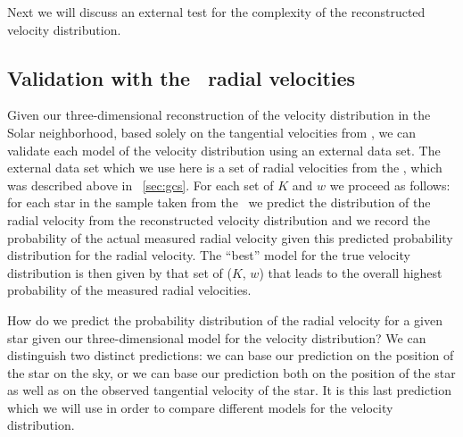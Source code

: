 Next we will discuss an external test for the complexity of the
reconstructed velocity distribution.



\subsection{Validation with the \gcsabb\ radial velocities}

Given our three-dimensional reconstruction of the velocity
distribution in the Solar neighborhood, based solely on the tangential
velocities from \Hipparcos, we can validate each model of the velocity
distribution using an external data set. The external data set which
we use here is a set of radial velocities from the \gcs, which was
described above in \sectionname~\ref{sec:gcs}. For each set of $K$ and
$w$ we proceed as follows: for each star in the sample taken from the
\gcsabb\ we predict the distribution of the radial velocity from the
reconstructed velocity distribution and we record the probability of
the actual measured radial velocity given this predicted probability
distribution for the radial velocity. The ``best'' model for the true
velocity distribution is then given by that set of ($K$, $w$) that
leads to the overall highest probability of the measured radial
velocities.

How do we predict the probability distribution of the radial velocity
for a given star given our three-dimensional model for the velocity
distribution?  We can distinguish two distinct predictions: we can
base our prediction on the position of the star on the sky, or we can
base our prediction both on the position of the star as well as on the
observed tangential velocity of the star. It is this last prediction
which we will use in order to compare different models for the
velocity distribution.

